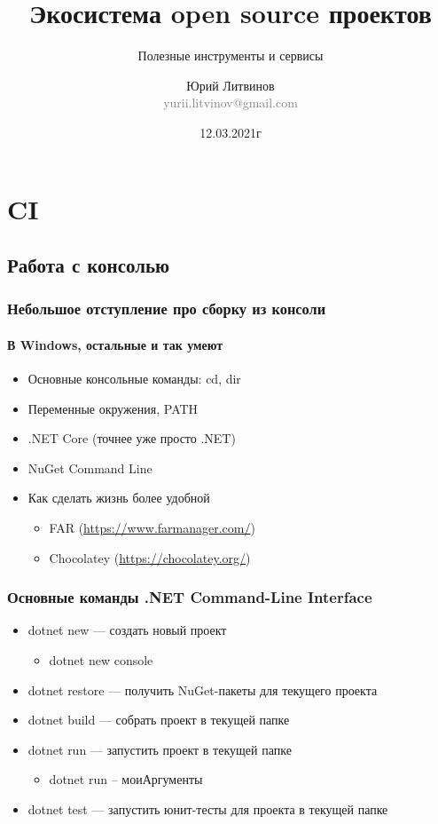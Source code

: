 \documentclass[xetex,mathserif,serif]{beamer}
\title{Экосистема open source проектов}
\subtitle{Полезные инструменты и сервисы}
\author[Юрий Литвинов]{Юрий Литвинов\\\small{\textcolor{gray}{yurii.litvinov@gmail.com}}}
\date{12.03.2021г}
\begin{document}
    \frame{\titlepage}

    \section{CI}

    \subsection{Работа с консолью}

    \begin{frame}
        \frametitle{Небольшое отступление про сборку из консоли}
        \framesubtitle{В Windows, остальные и так умеют}
        \begin{itemize}
            \item Основные консольные команды: cd, dir
            \item Переменные окружения, PATH
            \item .NET Core (точнее уже просто .NET)
            \item NuGet Command Line
            \item Как сделать жизнь более удобной
            \begin{itemize}
                \item FAR (\url{https://www.farmanager.com/})
                \item Chocolatey (\url{https://chocolatey.org/})
            \end{itemize}
        \end{itemize}
    \end{frame}

    \begin{frame}
        \frametitle{Основные команды .NET Command-Line Interface}
        \begin{itemize}
            \item dotnet new --- создать новый проект
            \begin{itemize}
                \item dotnet new console
            \end{itemize}
            \item dotnet restore --- получить NuGet-пакеты для текущего проекта
            \item dotnet build --- собрать проект в текущей папке
            \item dotnet run --- запустить проект в текущей папке
            \begin{itemize}
                \item dotnet run -- моиАргументы
            \end{itemize}
            \item dotnet test --- запустить юнит-тесты для проекта в текущей папке
        \end{itemize}
    \end{frame}
\end{document}
